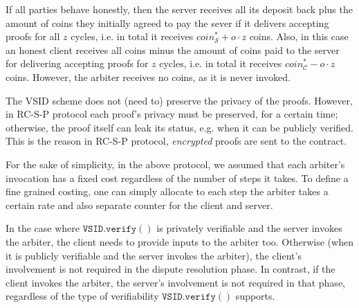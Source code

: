 \begin{remark} If all parties behave honestly,   then the server receives all its deposit back plus the amount of coins they initially agreed to pay the sever if it  delivers accepting proofs for all $z$ cycles, i.e. in total it receives $coin^{\scriptscriptstyle *}_{\scriptscriptstyle\mathcal S}+o\cdot z$ coins. Also, in this case an honest client receives all coins minus the amount of coins paid to the server for delivering accepting proofs for $z$ cycles, i.e. in total it receives $coin^{\scriptscriptstyle *}_{\scriptscriptstyle\mathcal C}-o\cdot z$ coins. However, the arbiter receives no coins, as it is never invoked. 







\end{remark}
\begin{remark} The VSID scheme  does not (need to) preserve the privacy of the proofs. However, in RC-S-P  protocol  each proof's privacy must be preserved, for a certain time; otherwise, the proof itself can leak its status, e.g. when it can be publicly verified. This is the reason in RC-S-P protocol,  \emph{encrypted} proofs are sent to the contract.   
\end{remark}


\begin{remark}
For the sake of simplicity, in the above protocol, we assumed that each arbiter's invocation has a fixed  cost regardless of the number of steps it takes. To define a fine grained costing, one can simply allocate to each step the arbiter takes a certain rate and also separate counter  for the client and server.  
\end{remark}

\begin{remark}
In the case where $\mathtt{VSID.verify}()$ is privately verifiable and    the server invokes the arbiter, the client needs to provide inputs to the arbiter too. Otherwise (when it is publicly verifiable and  the server invokes the arbiter), the client's involvement is not required in the dispute resolution phase.  In contrast, if the client invokes the arbiter, the server's involvement is not required in that phase, regardless of the type of verifiability $\mathtt{VSID.verify}()$ supports. 
\end{remark}

